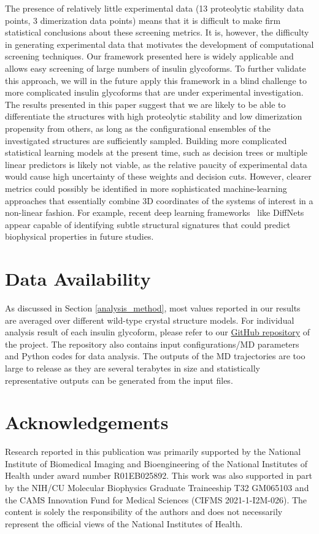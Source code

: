 \documentclass[sn-vancouver]{sn-jnl}
\begin{document}
The presence of relatively little experimental data (13 proteolytic stability data points, 3 dimerization data points) means that it is difficult to make firm statistical conclusions about these screening metrics. It is, however, the difficulty in generating experimental data that motivates the development of computational screening techniques.  Our framework presented here is widely applicable and allows easy screening of large numbers of insulin glycoforms. To further validate this approach, we will in the future apply this framework in a blind challenge to more complicated insulin glycoforms that are under experimental investigation. The results presented in this paper suggest that we are likely to be able to differentiate the structures with high proteolytic stability and low dimerization propensity from others, as long as the configurational ensembles of the investigated structures are sufficiently sampled. Building more complicated statistical learning models at the present time, such as decision trees or multiple linear predictors is likely not viable, as the relative paucity of experimental data would cause high uncertainty of these weights and decision cuts. However, clearer metrics could possibly be identified in more sophisticated machine-learning approaches that essentially combine 3D coordinates of the systems of interest in a non-linear fashion. For example, recent deep learning frameworks~\cite{ward2021deep} like DiffNets appear capable of identifying subtle structural signatures that could predict biophysical properties in future studies.



\section{Data Availability}
As discussed in Section \ref{analysis_method}, most values reported in our results are averaged over different wild-type crystal structure models. For individual analysis result of each insulin glycoform, please refer to our \href{https://github.com/shirtsgroup/Glycoinsulin_project}{GitHub repository} of the project. The repository also contains input configurations/MD parameters and Python codes for data analysis. The outputs of the MD trajectories are too large to release as they are several terabytes in size and statistically representative outputs can be generated from the input files.   
\section{Acknowledgements}
Research reported in this publication was primarily supported by the National Institute of Biomedical Imaging and Bioengineering of the National Institutes of Health under award number R01EB025892. This work was also supported in part by the NIH/CU Molecular Biophysics Graduate Traineeship T32 GM065103 and the CAMS Innovation Fund for Medical Sciences (CIFMS 2021-1-I2M-026). The content is solely the responsibility of the authors and does not necessarily represent the official views of the National Institutes of Health.
\end{document}
